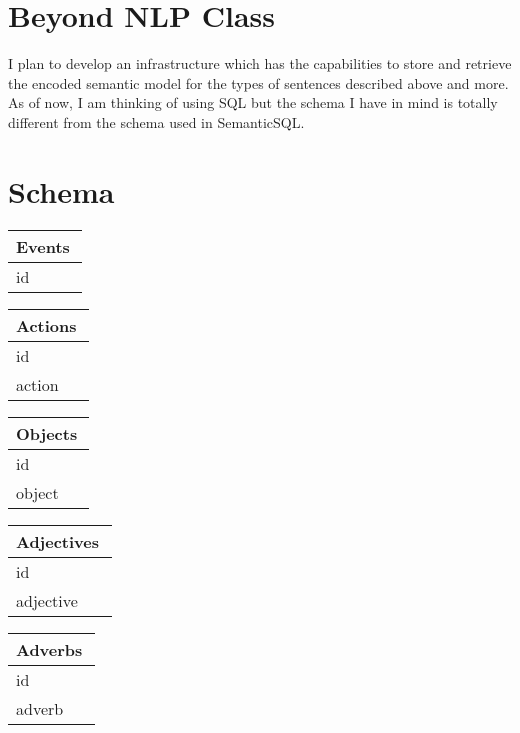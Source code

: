 \documentclass[10pt]{article}
\begin{document}
\section{Beyond NLP Class}
I plan to develop an infrastructure which has the capabilities to store and retrieve the encoded semantic model for the types of sentences described above and more. As of now, I am thinking of using SQL but the schema I have in mind is totally different from the schema used in SemanticSQL.

\section{Schema}
\begin{multicols}{2}

\begin{tabular}{|p{0.95\linewidth}|} 
\hline                   
\textbf{Events}
\\
\hline
id\\
\hline
\end{tabular}



\begin{tabular}{|p{0.95\linewidth}|} 
\hline                   
\textbf{Actions}
\\
\hline
id\\
\hline
action\\
\hline
\end{tabular}



\begin{tabular}{|p{0.95\linewidth}|} 
\hline                   
\textbf{Objects}
\\
\hline
id\\
\hline
object\\
\hline
\end{tabular}




\begin{tabular}{|p{0.95\linewidth}|} 
\hline                   
\textbf{Adjectives}
\\
\hline
id\\
\hline
adjective\\
\hline
\end{tabular}





\begin{tabular}{|p{0.95\linewidth}|} 
\hline                   
\textbf{Adverbs}
\\
\hline
id\\
\hline
adverb\\
\hline
\end{tabular}




\end{multicols}
\end{document}
